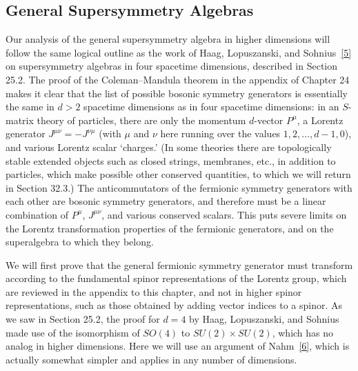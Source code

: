 
\subsection{General Supersymmetry Algebras}

Our analysis of the general supersymmetry algebra in higher dimensions will
follow the same logical outline as the work of Haag, Lopuszanski, and
Sohnius~\hyperref[ch32-ref-5]{[5]} on supersymmetry algebras in four
spacetime dimensions, described in Section 25.2. The proof of the
Coleman--Mandula theorem in the appendix of Chapter 24 makes it clear that
the list of possible bosonic symmetry generators is essentially the same in
\(d>2\) spacetime dimensions as in four spacetime dimensions: in an
\(S\)-matrix theory of particles, there are only the momentum \(d\)-vector
\(P^\mu\), a Lorentz generator \(J^{\mu\nu}=-J^{\nu\mu}\) (with \(\mu\)
and \(\nu\) here running over the values \(1,2,\ldots,d-1,0\)), and various
Lorentz scalar `charges.' (In some theories there are topologically stable
extended objects such as closed strings, membranes, etc., in addition to
particles, which make possible other conserved quantities, to which we will
return in Section 32.3.) The anticommutators of the fermionic symmetry
generators with each other are bosonic symmetry generators, and therefore
must be a linear combination of \(P^\mu\), \(J^{\mu\nu}\), and various
conserved scalars. This puts severe limits on the Lorentz transformation
properties of the fermionic generators, and on the superalgebra to which
they belong.

We will first prove that the general fermionic symmetry generator must
transform according to the fundamental spinor representations of the
Lorentz group, which are reviewed in the appendix to this chapter, and not
in higher spinor representations, such as those obtained by adding vector
indices to a spinor. As we saw in Section 25.2, the proof for \(d=4\) by
Haag, Lopuszanski, and Sohnius made use of the isomorphism of \(SO(4)\) to
\(SU(2)\times SU(2)\), which has no analog in higher dimensions.
Here we will use an argument of Nahm~\hyperref[ch32-ref-6]{[6]}, which is
actually somewhat simpler and applies in any number of dimensions.

